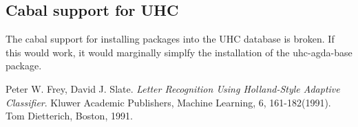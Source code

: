 \documentclass[12pt, a4paper, twoside]{report}
\begin{document}
\subsection{Cabal support for UHC}
The cabal support for installing packages into the UHC database is broken. If this would work, it
would marginally simplfy the installation of the uhc-agda-base package.

\begin{thebibliography}{1}

  Peter W. Frey, David J. Slate.
  \emph{Letter Recognition Using Holland-Style Adaptive Classifier}.
  Kluwer Academic Publishers,
  Machine Learning, 6, 161-182(1991).
  Tom Dietterich, Boston,
  1991.

\end{thebibliography}
\end{document}
